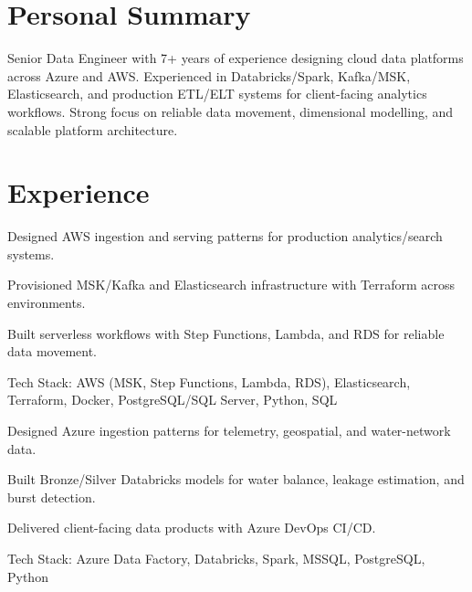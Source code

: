 \documentclass[]{deedy-resume-openfont}
\begin{document}
\hfill
\begin{minipage}[t]{0.66\textwidth} 



\section{Personal Summary}

Senior Data Engineer with 7+ years of experience designing cloud data platforms across Azure and AWS. Experienced in Databricks/Spark, Kafka/MSK, Elasticsearch, and production ETL/ELT systems for client-facing analytics workflows. Strong focus on reliable data movement, dimensional modelling, and scalable platform architecture.


\section{Experience}
\vspace{\topsep}
\begin{tightemize}

\item Designed AWS ingestion and serving patterns for production analytics/search systems.

\item Provisioned MSK/Kafka and Elasticsearch infrastructure with Terraform across environments.

\item Built serverless workflows with Step Functions, Lambda, and RDS for reliable data movement.

\end{tightemize}
Tech Stack: AWS (MSK, Step Functions, Lambda, RDS), Elasticsearch, Terraform, Docker, PostgreSQL/SQL Server, Python, SQL
\sectionsep


\vspace{\topsep}
\begin{tightemize}
\item Designed Azure ingestion patterns for telemetry, geospatial, and water-network data.
\item Built Bronze/Silver Databricks models for water balance, leakage estimation, and burst detection.
\item Delivered client-facing data products with Azure DevOps CI/CD.
\end{tightemize}
Tech Stack: Azure Data Factory, Databricks, Spark, MSSQL, PostgreSQL, Python
\sectionsep


\end{minipage}
\end{document}
